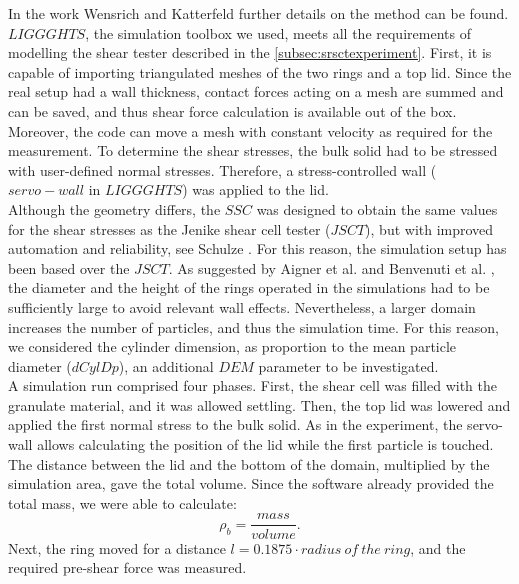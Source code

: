 \documentclass[review]{elsarticle}
\begin{document}
\begin{appendix}
In the work Wensrich and Katterfeld \cite{RefWorks:87} further details on the
method can be found.\\
$LIGGGHTS$, the simulation toolbox we used, meets all the requirements of
modelling the shear tester described in the \ref{subsec:srsctexperiment}. 
First, it is capable of importing triangulated meshes of the two rings and a top lid. 
Since the real setup had a wall thickness, contact forces acting on a mesh are summed and can be saved, 
and thus shear force calculation is available out of the box. Moreover, the code can move a mesh with constant 
velocity as required for the measurement. To determine the shear stresses, the bulk solid had to be stressed with 
user-defined normal stresses. Therefore, a stress-controlled wall ($servo-wall$ in $LIGGGHTS$) was applied to the lid. \\
Although the geometry differs, the $SSC$ was designed to obtain the same values for the shear stresses as the 
Jenike shear cell tester ($JSCT$), but with improved automation and reliability,
see Schulze \cite{RefWorks:118}. 
For this reason, the simulation setup has been
based over the $JSCT$.
As suggested by Aigner et al. \cite{RefWorks:139} and Benvenuti et al. \cite{RefWorks:173}, 
the diameter and the height of the rings operated in the simulations had to be sufficiently large to avoid relevant wall effects. 
Nevertheless, a larger domain increases the number of particles, and thus the simulation time. 
For this reason, we considered the cylinder dimension, as proportion to the mean particle diameter ($dCylDp$), 
an additional $DEM$ parameter to be investigated. \\   
A simulation run comprised four phases. 
First, the shear cell was filled with the granulate material, and it was allowed
settling.
Then, the top lid was lowered and applied the first normal stress to the bulk solid. 
As in the experiment, the servo-wall allows calculating the position of the lid
while the first particle is touched. 
The distance between the lid and the bottom of the domain, multiplied by the 
simulation area, gave the total volume.
Since the software already provided the total mass, we were able to calculate:
\begin{equation}
\rho_b = \frac{mass}{volume}.
 \label{eq:rhob}
\end{equation}
Next, the ring moved for a distance $l=0.1875 \cdot radius ~of ~the ~ring$, and the required pre-shear force was measured. 

\end{appendix}
\end{document}
